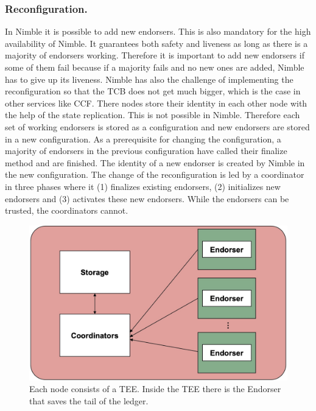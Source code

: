 	\subsubsection*{Reconfiguration.}
	In Nimble it is possible to add new endorsers. This is also mandatory for the high availability of Nimble. It guarantees both safety and liveness as long as there is a majority of endorsers working. Therefore it is important to add new endorsers if some of them fail because if a majority fails and no new ones are added, Nimble has to give up its liveness. Nimble has also the challenge of implementing the reconfiguration so that the TCB does not get much bigger, which is the case in other services like CCF. There nodes store their identity in each other node with the help of the state replication. This is not possible in Nimble. Therefore each set of working endorsers is stored as a configuration and new endorsers are stored in a new configuration. As a prerequisite for changing the configuration, a majority of endorsers in the previous configuration have called their finalize method and are finished. The identity of a new endorser is created by Nimble in the new configuration. The change of the reconfiguration is led by a coordinator in three phases where it (1) finalizes existing endorsers, (2) initializes new endorsers and (3) activates these new endorsers. While the endorsers can be trusted, the coordinators cannot. 
	
\begin{figure}[b]
	\includegraphics[scale=0.14]{pictures/nimble}
	\caption{Each node consists of a TEE. Inside the TEE there is the Endorser that saves the tail of the ledger.}
	\label{nimble}
\end{figure}
